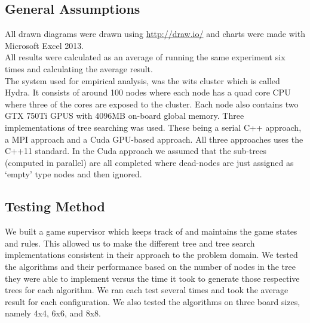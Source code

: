 \documentclass[11pt]{article}
\begin{document}
\begin{page}
\subsection{General Assumptions}
All drawn diagrams were drawn using \url{http://draw.io/} and charts were made with Microsoft Excel 2013.\\ All results were calculated as an average of running the same experiment six times and calculating the average result.\\
\noindent The system used for empirical analysis, was the wits cluster which is called Hydra. It consists of around 100 nodes where each node has a quad core CPU where three of the cores are exposed to the cluster. Each node also contains two GTX 750Ti GPUS with 4096MB on-board global memory.
Three implementations of tree searching was used. These being a serial C++ approach, a MPI approach and a Cuda GPU-based approach. All three approaches uses the C++11 standard.
In the Cuda approach we assumed that the sub-trees (computed in parallel) are all completed where dead-nodes are just assigned as ‘empty’ type nodes and then ignored.


\subsection{Testing Method}
We built a game supervisor which keeps track of and maintains the game states and rules. This allowed us to make the different tree and tree search implementations consistent in their approach to the problem domain. 
We tested the algorithms and their performance based on the number of nodes in the tree they were able to implement versus the time it took to generate those respective trees for each algorithm. We ran each test several times and took the average result for each configuration.
We also tested the algorithms on three board sizes, namely 4x4, 6x6, and 8x8.



\end{page}
\end{document}
